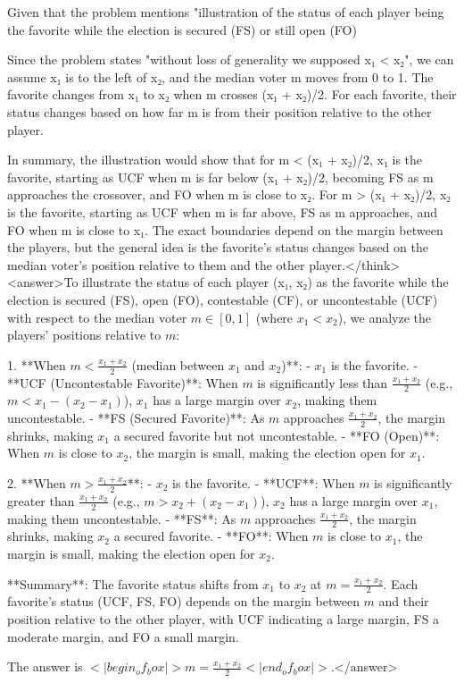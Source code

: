 Given that the problem mentions "illustration of the status of each player being the favorite while the election is secured (FS) or still open (FO) %

Since the problem states "without loss of generality we supposed x₁ < x₂", we can assume x₁ is to the left of x₂, and the median voter m moves from 0 to 1. The favorite changes from x₁ to x₂ when m crosses (x₁ + x₂)/2. For each favorite, their status changes based on how far m is from their position relative to the other player. 

In summary, the illustration would show that for m < (x₁ + x₂)/2, x₁ is the favorite, starting as UCF when m is far below (x₁ + x₂)/2, becoming FS as m approaches the crossover, and FO when m is close to x₂. For m > (x₁ + x₂)/2, x₂ is the favorite, starting as UCF when m is far above, FS as m approaches, and FO when m is close to x₁. The exact boundaries depend on the margin between the players, but the general idea is the favorite's status changes based on the median voter's position relative to them and the other player.</think><answer>To illustrate the status of each player (x₁, x₂) as the favorite while the election is secured (FS), open (FO), contestable (CF), or uncontestable (UCF) with respect to the median voter \( m \in [0, 1] \) (where \( x_1 < x_2 \)), we analyze the players' positions relative to \( m \):

1. **When \( m < \frac{x_1 + x_2}{2} \) (median between \( x_1 \) and \( x_2 \))**:  
   - \( x_1 \) is the favorite.  
   - **UCF (Uncontestable Favorite)**: When \( m \) is significantly less than \( \frac{x_1 + x_2}{2} \) (e.g., \( m < x_1 - (x_2 - x_1) \)), \( x_1 \) has a large margin over \( x_2 \), making them uncontestable.  
   - **FS (Secured Favorite)**: As \( m \) approaches \( \frac{x_1 + x_2}{2} \), the margin shrinks, making \( x_1 \) a secured favorite but not uncontestable.  
   - **FO (Open)**: When \( m \) is close to \( x_2 \), the margin is small, making the election open for \( x_1 \).  

2. **When \( m > \frac{x_1 + x_2}{2} \)**:  
   - \( x_2 \) is the favorite.  
   - **UCF**: When \( m \) is significantly greater than \( \frac{x_1 + x_2}{2} \) (e.g., \( m > x_2 + (x_2 - x_1) \)), \( x_2 \) has a large margin over \( x_1 \), making them uncontestable.  
   - **FS**: As \( m \) approaches \( \frac{x_1 + x_2}{2} \), the margin shrinks, making \( x_2 \) a secured favorite.  
   - **FO**: When \( m \) is close to \( x_1 \), the margin is small, making the election open for \( x_2 \).  

**Summary**: The favorite status shifts from \( x_1 \) to \( x_2 \) at \( m = \frac{x_1 + x_2}{2} \). Each favorite's status (UCF, FS, FO) depends on the margin between \( m \) and their position relative to the other player, with UCF indicating a large margin, FS a moderate margin, and FO a small margin.  

The answer is \(<|begin_of_box|>m = \frac{x_1 + x_2}{2}<|end_of_box|>\).</answer>